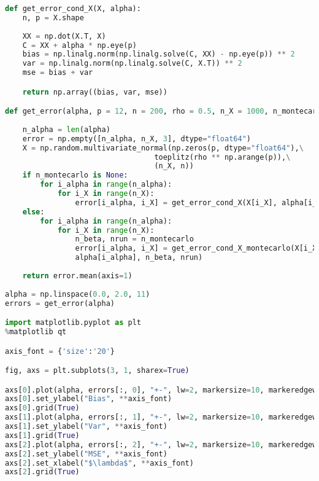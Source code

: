 \documentclass{article}
\begin{document}
\begin{lstlisting}[language=Python]
def get_error_cond_X(X, alpha):
    n, p = X.shape
    
    XX = np.dot(X.T, X)
    C = XX + alpha * np.eye(p)
    bias = np.linalg.norm(np.linalg.solve(C, XX) - np.eye(p)) ** 2
    var = np.linalg.norm(np.linalg.solve(C, X.T)) ** 2
    mse = bias + var

    return np.array((bias, var, mse))

def get_error(alpha, p = 12, n = 200, rho = 0.5, n_X = 1000, n_montecarlo = None):
    
    n_alpha = len(alpha)
    error = np.empty([n_alpha, n_X, 3], dtype="float64")
    X = np.random.multivariate_normal(np.zeros(p, dtype="float64"),\
                                  toeplitz(rho ** np.arange(p)),\
                                  (n_X, n))
    if n_montecarlo is None:
        for i_alpha in range(n_alpha):
            for i_X in range(n_X):
                error[i_alpha, i_X] = get_error_cond_X(X[i_X], alpha[i_alpha])
    else:
        for i_alpha in range(n_alpha):
            for i_X in range(n_X):
                n_beta, nrun = n_montecarlo
                error[i_alpha, i_X] = get_error_cond_X_montecarlo(X[i_X],\
                alpha[i_alpha], n_beta, nrun)
        
    return error.mean(axis=1)
    
alpha = np.linspace(0.0, 2.0, 11)
errors = get_error(alpha)

import matplotlib.pyplot as plt
%matplotlib qt

axis_font = {'size':'20'}

fig, axs = plt.subplots(3, 1, sharex=True)

axs[0].plot(alpha, errors[:, 0], "+-", lw=2, markersize=10, markeredgewidth=2)
axs[0].set_ylabel("Bias", **axis_font)
axs[0].grid(True)
axs[1].plot(alpha, errors[:, 1], "+-", lw=2, markersize=10, markeredgewidth=2)
axs[1].set_ylabel("Var", **axis_font)
axs[1].grid(True)
axs[2].plot(alpha, errors[:, 2], "+-", lw=2, markersize=10, markeredgewidth=2)
axs[2].set_ylabel("MSE", **axis_font)
axs[2].set_xlabel("$\lambda$", **axis_font)
axs[2].grid(True)
\end{lstlisting} 
  
\end{document}
